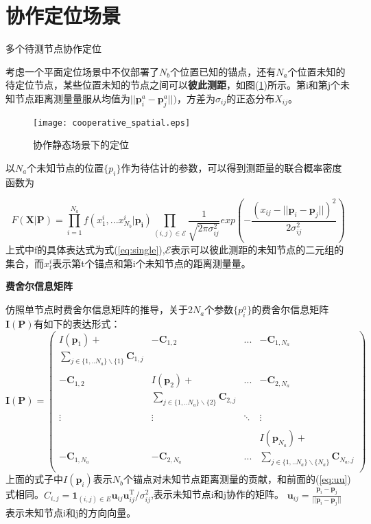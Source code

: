\section[协作定位场景]{协作定位场景}\label{section:cooperative_localization}

多个待测节点协作定位

考虑一个平面定位场景中不仅部署了$N_b$个位置已知的锚点，还有$N_a$个位置未知的待定位节点，某些位置未知的节点之间可以\textbf{彼此测距}，如图(\ref{fig:cooperative_spatial})所示。第i和第j个未知节点距离测量量服从均值为$||\bm{p}^a_i-\bm{p}^a_j||)$，方差为$\sigma_{ij}$的正态分布$X_{ij}$。
        \begin{figure}
          \centering
          \texttt{[image: cooperative\_spatial.eps]}
          \caption{协作静态场景下的定位}\label{fig:cooperative_spatial}
        \end{figure}

以$N_a$个未知节点的位置$\{p_i\}$作为待估计的参数，可以得到测距量的联合概率密度函数为

\begin{equation}
F(\bm{X}|\bm{P})=\prod_{i=1}^{N_a} f(x^i_1,...x^{i}_{N_b}|\bm{p_i})\prod_{(i,j)\in \mathcal{E}}\frac{1}{\sqrt{2\pi\sigma_{ij}^2}}exp\left(-\frac{(x_{ij}-||\bm{p}_i-\bm{p}_j||)^2}{2\sigma_{ij}^2}\right)
\end{equation}
上式中f的具体表达式为式(\ref{eq:single}),$\mathcal{E}$表示可以彼此测距的未知节点的二元组的集合，而$x_t^i$表示第t个锚点和第i个未知节点的距离测量量。

\textbf{费舍尔信息矩阵}

仿照单节点时费舍尔信息矩阵的推导，关于$2N_a$个参数$\{p_i^a\}$的费舍尔信息矩阵$\bm{I}(\bm{P})$有如下的表达形式：
\begin{equation}
\bm{I}(\bm{P})=
\left(
\begin{array}{cccc}
I(\bm{p}_1)+&-\bm{C}_{1,2}&...&-\bm{C}_{1,N_a}\\
\sum_{j\in \{1,..N_a\}\backslash\{1\}}\bm{C}_{1,j}&&&\\
&&&\\
-\bm{C}_{1,2} & I(\bm{p}_2)+
&...&-\bm{C}_{2,N_a}\\
&\sum_{j\in \{1,..N_a\}\backslash \{2\}}\bm{C}_{2,j}&&\\
&&&\\
\vdots &\vdots&\ddots &\vdots\\
&&&\\
&&&I(\bm{p}_{N_a})+\\
-\bm{C}_{1,N_a}&-\bm{C}_{2,N_a}&...& \sum_{j\in \{1,..N_a\}\backslash\{N_a\}}\bm{C}_{N_a,j}\\
\end{array}
\right)
\end{equation}
上面的式子中$I(\bm{p}_i)$表示$N_b$个锚点对未知节点距离测量的贡献，和前面的(\ref{eq:uu})式相同。$C_{i,j}=\bm{1}_{(i,j)\in E}\bm{u}_{ij}\bm{u}_{ij}^{\textrm{T}} /\sigma^2_{ij}$,表示未知节点i和j协作的矩阵。
$\bm{u}_{ij}=\frac{\bm{p}_i-\bm{p}_j}{||\bm{p}_i-\bm{p}_j||}$表示未知节点i和j的方向向量。
